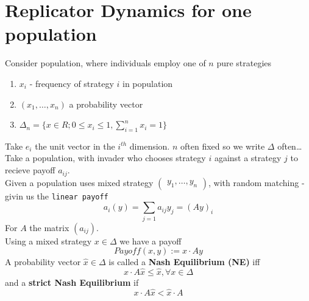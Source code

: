 \documentclass[a4paper]{article}
\begin{document}
\section{Replicator Dynamics for one population}

Consider population, where individuals employ one of $n$ pure strategies

\begin{enumerate}
    \item $x_i$ - frequency of strategy $i$ in population
    \item $(x_1 ,\ldots , x_n)$ a probability vector
    \item $ \Delta_n = \{x \in R; 0 \leq x_i \leq 1, \sum_{i=1}^{n} x_i = 1   \}$
\end{enumerate}

Take $e_{i}$ the unit vector in the $i^{th}$ dimension. $n$ often fixed so we write $\Delta$ often\dots
\\
Take a population, with invader who chooses strategy $i$ against a strategy $j$ to recieve payoff $a_{ij}$.\\
Given a population uses mixed strategy $\begin{pmatrix} y_1, \ldots ,y_n \end{pmatrix}$, with random matching - givin us the \texttt{linear payoff} 
\[
    a_{i} (y) = \sum_{j=1}a_{ij}  y_{j} = \left(Ay\right)_{i} 
\]
For $A$ the matrix $(a_{ij} )$.\\
Using a mixed strategy $x \in \Delta $ we have a payoff
\[
    {Payoff}(x,y) :=   x \cdot Ay
\]
A probability vector $\hat{x} \in \Delta $ is called a \textbf{Nash Equilibrium (NE)} iff
\[
    x\cdot A\hat{x} \leq  \hat{x} , \forall x \in \Delta 
\]
and a \textbf{strict Nash Equilibrium} if
\[
    x \cdot A \hat{x} < \hat{x} \cdot A
\]
\end{document}
